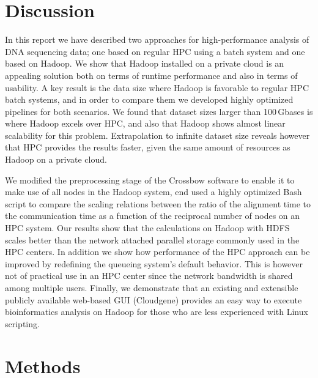 \documentclass[10pt]{article}
\begin{document}
\section*{Discussion}

In this report we have described two approaches for high-performance analysis of DNA sequencing data; one based on regular HPC using a batch system and one based on Hadoop. We show that Hadoop installed on a private cloud is an appealing solution both on terms of runtime performance and also in terms of usability. A key result is the data size where Hadoop is favorable to regular HPC batch systems, and in order to compare them we developed highly optimized pipelines for both scenarios. We found that dataset sizes larger than 100\,Gbases is where Hadoop excels over HPC, and also that Hadoop shows almost linear scalability for this problem. Extrapolation to infinite dataset size reveals however that HPC provides the results faster, given the same amount of resources as Hadoop on a private cloud.

We modified the preprocessing stage of the Crossbow software to enable it to make use of all nodes in the Hadoop system, end used a highly optimized Bash script to compare the scaling relations between the ratio of the alignment time to the communication time as a function of the reciprocal number of nodes on an HPC system. 
Our results show that the calculations on Hadoop with HDFS scales better than the network attached parallel storage commonly used in the HPC centers.
In addition we show how performance of the HPC approach can be improved by redefining the queueing system's default behavior. This is however not of practical use in an HPC center since the network bandwidth is shared among multiple users. Finally, we demonstrate that an existing and extensible publicly available web-based GUI (Cloudgene) provides an easy way to execute bioinformatics analysis on Hadoop for those who are less experienced with Linux scripting.









\section*{Methods}
\end{document}

